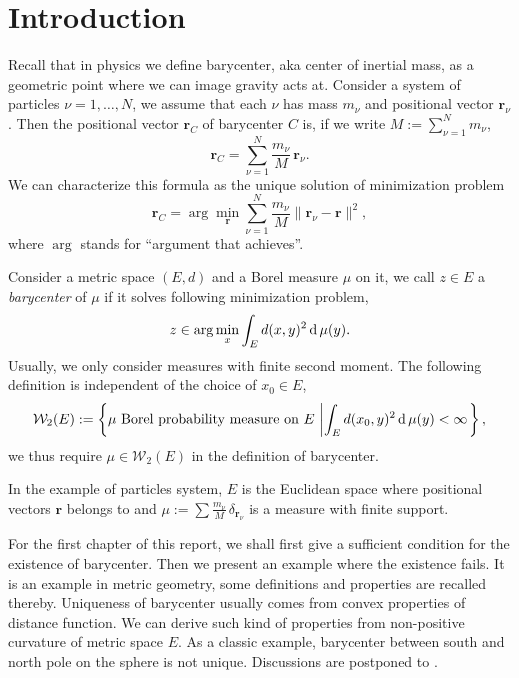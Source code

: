 \chapter*{Introduction}
Recall that in physics we define barycenter, aka center of inertial mass,
as a geometric point where we can image gravity acts at.
Consider a system of particles  $\nu = 1, \ldots , N$,
we assume that each $\nu$ has mass $m_\nu$ and positional vector $\boldsymbol{r}_\nu$.
Then the positional vector $\boldsymbol{r}_C$ of barycenter $C$ is,
if we write \( M := \sum _ { \nu = 1 } ^ { N } m _ { \nu }\),
\[
	\boldsymbol { r }_ { C } =
	\sum_ { \nu = 1 } ^ { N } \frac{m_ { \nu } }{M}\,\boldsymbol { r }_ { \nu }.
\]
We can characterize this formula as the unique solution of minimization problem
\begin{equation}
	\label{barycenter_def}
	\boldsymbol{r}_C = \arg \min_{\boldsymbol{r}} \sum_{\nu= 1}^N \frac{m_\nu}{M}
	\|\boldsymbol{r}_{\nu} - \boldsymbol{r}\|^2,
\end{equation}
where $\arg$ stands for ``argument that achieves''.

\begin{defn}
	Consider a metric space $(E,d)$ and a Borel measure $\mu$ on it,
	we call $z \in E$ a \emph{barycenter} of $\mu$ if it solves following minimization problem,
	\[
		z \in \arg\min_{x}\int_{E} d(x, y)^2 \operatorname{d} \mu (y).
	\]
	Usually, we only consider measures with finite second moment.
	The following definition is independent of the choice of $x_0 \in E$,
	\[
					\mathcal{W}_2(E): = \left\{ \mu \text{ Borel probability measure on } E \, \left|
				\int_{E} d(x_0, y)^2 \operatorname{d} \mu (y) < \infty \right. \right\},
	\]
	we thus require  $\mu \in \mathcal{W}_2(E)$ in the definition of barycenter.
\end{defn}
\begin{rmk}
	In the example of particles system,
	$E$ is the Euclidean space where positional vectors $\boldsymbol{r}$ belongs to
	and $\mu := \sum \frac{m_\nu}{M} \, \delta_{\boldsymbol{r}_\nu}$ is a measure with finite support.
\end{rmk}

For the first chapter of this report, we shall first give a sufficient condition for the existence of barycenter.
Then we present an example where the existence fails.
It is an example in metric geometry,
some definitions and properties are recalled thereby.
Uniqueness of barycenter usually comes from convex properties of distance function.
We can derive such kind of properties from non-positive curvature of metric space $E$.
As a classic example, barycenter between south and north pole on the sphere is not unique.
Discussions are postponed to .

